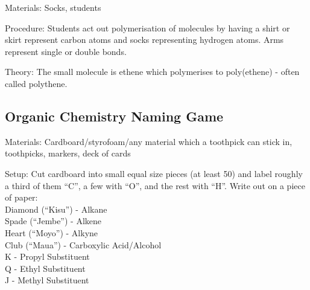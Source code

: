 \begin{multicols}{2}
\begin{description*}
\item[Materials:]{Socks, students}
\item[Procedure:]{Students act out polymerisation of molecules by having a shirt or skirt represent carbon atoms and socks representing hydrogen atoms. Arms represent single or double bonds.}
\item[Theory:]{The small molecule is ethene which polymerises to poly(ethene) - often called polythene.}
\end{description*}

\subsection{Organic Chemistry Naming Game}


\begin{description*}
\item[Materials:]{Cardboard/styrofoam/any material which a toothpick can stick in, toothpicks, markers, deck of cards}
\item[Setup:]{Cut cardboard into small equal size pieces (at least 50) and label roughly a third of them ``C'', a few with ``O'', and the rest with ``H''. Write out on a piece of paper:\\

Diamond (``Kisu'') - Alkane\\
Spade (``Jembe'') - Alkene\\
Heart (``Moyo'') - Alkyne\\
Club (``Maua'') - Carboxylic Acid/Alcohol\\

K - Propyl Substituent\\
Q - Ethyl Substituent\\
J - Methyl Substituent \\

}
\end{description*}
\end{multicols}
